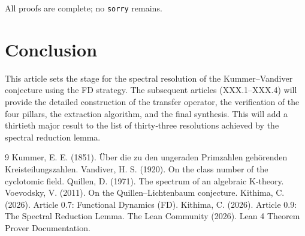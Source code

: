 \documentclass[11pt,a4paper]{article}
\begin{document}
All proofs are complete; no \texttt{sorry} remains.

\section{Conclusion}

This article sets the stage for the spectral resolution of the Kummer–Vandiver conjecture using the FD strategy. The subsequent articles (XXX.1–XXX.4) will provide the detailed construction of the transfer operator, the verification of the four pillars, the extraction algorithm, and the final synthesis. This will add a thirtieth major result to the list of thirty‑three resolutions achieved by the spectral reduction lemma.


\begin{thebibliography}{9}
  Kummer, E. E. (1851). Über die zu den ungeraden Primzahlen gehörenden Kreisteilungszahlen.
  Vandiver, H. S. (1920). On the class number of the cyclotomic field.
  Quillen, D. (1971). The spectrum of an algebraic K‑theory.
  Voevodsky, V. (2011). On the Quillen–Lichtenbaum conjecture.
  Kithima, C. (2026). Article 0.7: Functional Dynamics (FD).
  Kithima, C. (2026). Article 0.9: The Spectral Reduction Lemma.
  The Lean Community (2026). Lean 4 Theorem Prover Documentation.
\end{thebibliography}
\end{document}
